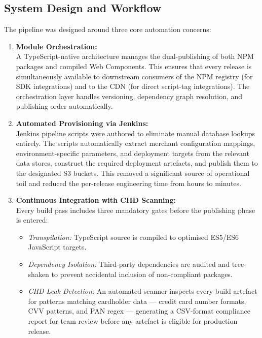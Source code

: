 \subsection{System Design and Workflow}

The pipeline was designed around three core automation concerns:

\begin{enumerate}
  \item \textbf{Module Orchestration:}\\
  A TypeScript-native architecture manages the dual-publishing of both NPM packages and compiled Web Components. This ensures that every release is simultaneously available to downstream consumers of the NPM registry (for SDK integrations) and to the CDN (for direct script-tag integrations). The orchestration layer handles versioning, dependency graph resolution, and publishing order automatically.

  \item \textbf{Automated Provisioning via Jenkins:}\\
  Jenkins pipeline scripts were authored to eliminate manual database lookups entirely. The scripts automatically extract merchant configuration mappings, environment-specific parameters, and deployment targets from the relevant data stores, construct the required deployment artefacts, and publish them to the designated S3 buckets. This removed a significant source of operational toil and reduced the per-release engineering time from hours to minutes.

  \item \textbf{Continuous Integration with CHD Scanning:}\\
  Every build pass includes three mandatory gates before the publishing phase is entered:
  \begin{itemize}
    \item \textit{Transpilation:} TypeScript source is compiled to optimised ES5/ES6 JavaScript targets.
    \item \textit{Dependency Isolation:} Third-party dependencies are audited and tree-shaken to prevent accidental inclusion of non-compliant packages.
    \item \textit{CHD Leak Detection:} An automated scanner inspects every build artefact for patterns matching cardholder data --- credit card number formats, CVV patterns, and PAN regex --- generating a CSV-format compliance report for team review before any artefact is eligible for production release.
  \end{itemize}
\end{enumerate}

